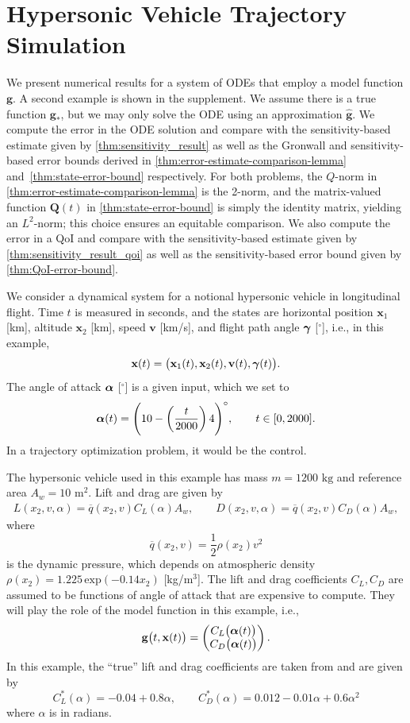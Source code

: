 \documentclass[onefignum,onetabnum]{siamart220329}
\numberwithin{equation}{section}
\newcommand{\bg}{\ensuremath{\mathbf{g}}} %
\newcommand{\bv}{\ensuremath{\mathbf{v}}} %
\newcommand{\bx}{\ensuremath{\mathbf{x}}} %
\newcommand{\balpha}{\ensuremath{\mbox{\boldmath $\alpha$}}}
\newcommand {\bgamma} {\mbox{\boldmath $\gamma$}}
\newcommand{\BQ}{\ensuremath{\mathbf{Q}} } %
\begin{document}
\section{Hypersonic Vehicle Trajectory Simulation} \label{sec:numerics_flap}
We present numerical results for a system of ODEs that employ a model function $\bg$. 
A second example is shown in the supplement.
We assume there is a true function $\bg_*$, but we may only solve the ODE using an approximation $\widehat{\bg}$. We compute the error in the ODE solution and compare with the sensitivity-based estimate given by \cref{thm:sensitivity_result} as well as the Gronwall and sensitivity-based error bounds derived in \cref{thm:error-estimate-comparison-lemma} and~\cref{thm:state-error-bound} respectively. For both problems, the $Q$-norm in \cref{thm:error-estimate-comparison-lemma} is the 2-norm, and the matrix-valued function $\BQ(t)$ in \cref{thm:state-error-bound} is simply the identity matrix, yielding an $L^2$-norm; this choice ensures an equitable comparison. We also compute the error in a QoI and compare with the sensitivity-based estimate given by \cref{thm:sensitivity_result_qoi} as well as the sensitivity-based error bound given by \cref{thm:QoI-error-bound}.

We consider a dynamical system for a notional hypersonic vehicle in longitudinal flight. 
Time $t$ is measured in seconds, and the states are horizontal position $\bx_1$ [km], altitude $\bx_2$ [km], speed $\bv$  [km/s], and flight path angle $\bgamma$  [$^\circ$],
i.e., in this example,
\[
	\bx(t) =  \big( \bx_1(t), \bx_2(t), \bv(t), \bgamma(t) \big).
\]
The angle of attack $\balpha$ [$^\circ$] is a given input, which we set to
\[
	\balpha(t) = \Bigg(10 - \left(\frac{t}{2000} \right) 4 \Bigg)^\circ, \qquad t \in [0, 2000].
\]
In a trajectory optimization problem, it would be the control. 

The hypersonic vehicle used in this example has mass $m = 1200 \textrm{ kg}$ 
and reference area $A_w = 10 \textrm{ m$^2$}$. Lift and drag are given by
 \begin{align*}
			L(x_2, v, \alpha) = \overline{q}(x_2, v) C_L(\alpha) A_w, \qquad
			D(x_2, v, \alpha) = \overline{q}(x_2, v) C_D(\alpha) A_w, 
\end{align*}
where
\begin{equation*}
	\overline{q}(x_2, v) = \frac{1}{2} \rho(x_2) v^2 
\end{equation*}
is the dynamic pressure, which depends on atmospheric density $\rho(x_2) = 1.225 \, \mathrm{exp}(-0.14 x_2)$ [kg/m$^3$].
The lift and drag coefficients $C_L, C_D$ are assumed to be functions of angle of attack that are expensive to compute. They will play the role of the model function in this example, i.e.,
\[
      \bg \big(t, \bx(t) \big) =  \begin{pmatrix}  C_L \big(\balpha(t) \big)  \\  C_D \big(\balpha(t) \big) \end{pmatrix}.
\]
In this example, the ``true'' lift and drag coefficients are taken from \cite{STauqeerulIslamRizvi_LHe_DXu_2015a} and are given by
\[
	C_L^*(\alpha) = -0.04 + 0.8 \alpha, \qquad C_D^*(\alpha) = 0.012 - 0.01\alpha + 0.6 \alpha^2
\]
where $\alpha$ is in radians.
\end{document}
